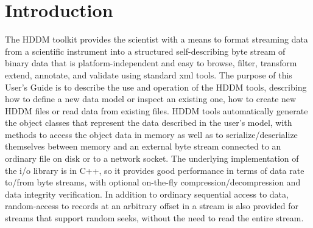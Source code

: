 \documentclass{revtex4}
\begin{document}
%
%
%
%

\tableofcontents
\section{Introduction}

The HDDM toolkit provides the scientist with a means to format streaming data
from a scientific instrument into a structured self-describing byte stream of
binary data that is platform-independent and easy to browse, filter, transform
extend, annotate, and validate using standard xml tools. The purpose of this 
User's Guide is to describe the use and operation of the HDDM tools, describing
how to define a new data model or inspect an existing one, how to create new
HDDM files or read data from existing files. HDDM tools automatically generate
the object classes that represent the data described in the user's model, with
methods to access the object data in memory as well as to serialize/deserialize
themselves between memory and an external byte stream connected to an ordinary
file on disk or to a network socket. The underlying implementation of the i/o
library is in C++, so it provides good performance in terms of data rate to/from
byte streams, with optional on-{}the-{}fly compression/decompression and data 
integrity verification. In addition to ordinary sequential access to data,
random-{}access to records at an arbitrary offset in a stream is also provided
for streams that support random seeks, without the need to read the entire stream.
\end{document}
